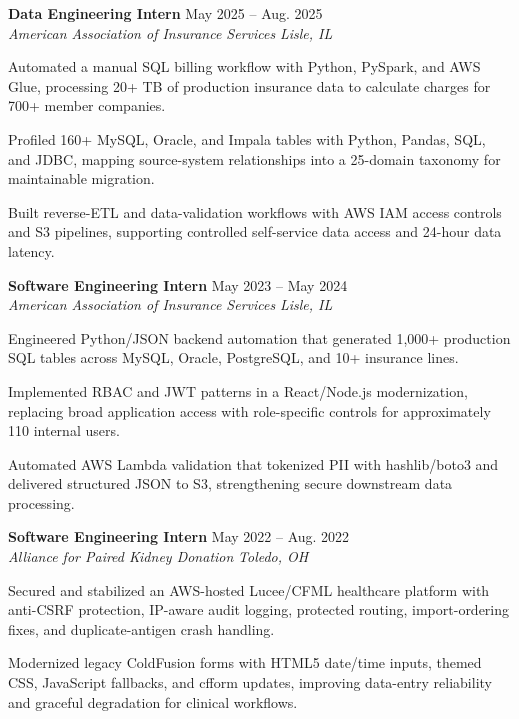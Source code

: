 \documentclass[letterpaper,11pt]{article}
\newcommand{\resumeSubheading}[4]{
  \textbf{#1} \hfill #2\\
  \textit{#3} \hfill \textit{#4}
}
\begin{document}
\resumeSubheading
{Data Engineering Intern}{May 2025 -- Aug. 2025}
{American Association of Insurance Services}{Lisle, IL}
\begin{tightitemize}
  \item Automated a manual SQL billing workflow with Python, PySpark, and AWS Glue, processing 20+ TB of production insurance data to calculate charges for 700+ member companies.
  \item Profiled 160+ MySQL, Oracle, and Impala tables with Python, Pandas, SQL, and JDBC, mapping source-system relationships into a 25-domain taxonomy for maintainable migration.
  \item Built reverse-ETL and data-validation workflows with AWS IAM access controls and S3 pipelines, supporting controlled self-service data access and 24-hour data latency.
\end{tightitemize}

\resumeSubheading
{Software Engineering Intern}{May 2023 -- May 2024}
{American Association of Insurance Services}{Lisle, IL}
\begin{tightitemize}
  \item Engineered Python/JSON backend automation that generated 1,000+ production SQL tables across MySQL, Oracle, PostgreSQL, and 10+ insurance lines.
  \item Implemented RBAC and JWT patterns in a React/Node.js modernization, replacing broad application access with role-specific controls for approximately 110 internal users.
  \item Automated AWS Lambda validation that tokenized PII with hashlib/boto3 and delivered structured JSON to S3, strengthening secure downstream data processing.
\end{tightitemize}

\resumeSubheading
{Software Engineering Intern}{May 2022 -- Aug. 2022}
{Alliance for Paired Kidney Donation}{Toledo, OH}
\begin{tightitemize}
  \item Secured and stabilized an AWS-hosted Lucee/CFML healthcare platform with anti-CSRF protection, IP-aware audit logging, protected routing, import-ordering fixes, and duplicate-antigen crash handling.
  \item Modernized legacy ColdFusion forms with HTML5 date/time inputs, themed CSS, JavaScript fallbacks, and cfform updates, improving data-entry reliability and graceful degradation for clinical workflows.
\end{tightitemize}
\end{document}
